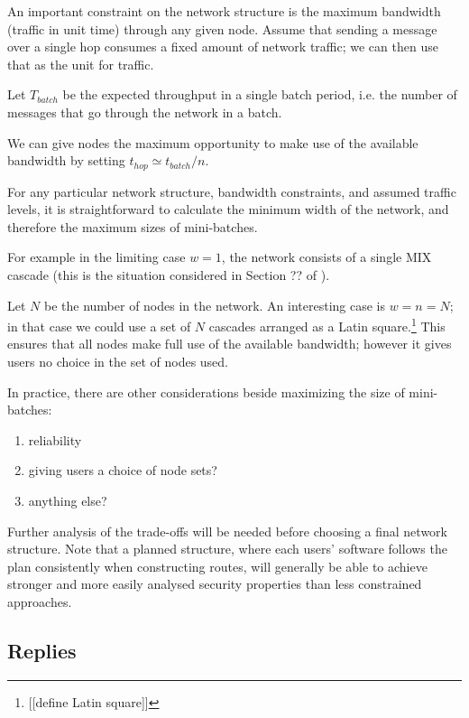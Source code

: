\documentclass{llncs}
\begin{document}
An important constraint on the network structure is the maximum
bandwidth (traffic in unit time) through any given node.
Assume that sending a message over a single hop consumes a fixed
amount of network traffic; we can then use that as the unit for
traffic.

Let $T_{batch}$ be the expected throughput in a single batch period,
i.e. the number of messages that go through the network in a batch.

We can give nodes the maximum opportunity to make use of the available
bandwidth by setting $t_{hop} \simeq t_{batch}/n$.


For any particular network structure, bandwidth constraints, and
assumed traffic levels, it is straightforward to calculate the
minimum width of the network, and therefore the maximum sizes of
mini-batches.

For example in the limiting case $w = 1$, the network consists of a
single MIX cascade (this is the situation considered in Section ??
of \cite{babel}).

Let $N$ be the number of nodes in the network. An interesting case
is $w = n = N$; in that case we could use a set of $N$ cascades
arranged as a Latin square.\footnote{[[define Latin square]]}
This ensures that all nodes make full use of the available bandwidth;
however it gives users no choice in the set of nodes used.

In practice, there are other considerations beside maximizing the
size of mini-batches:

\begin{enumerate}
\item reliability
\item giving users a choice of node sets?
\item anything else?
\end{enumerate}

Further analysis of the trade-offs will be needed before choosing a
final network structure. Note that a planned structure, where each
users' software follows the plan consistently when constructing
routes, will generally be able to achieve stronger and more easily
analysed security properties than less constrained approaches.

\subsection{Replies}
\label{subsec:replies}
\end{document}
